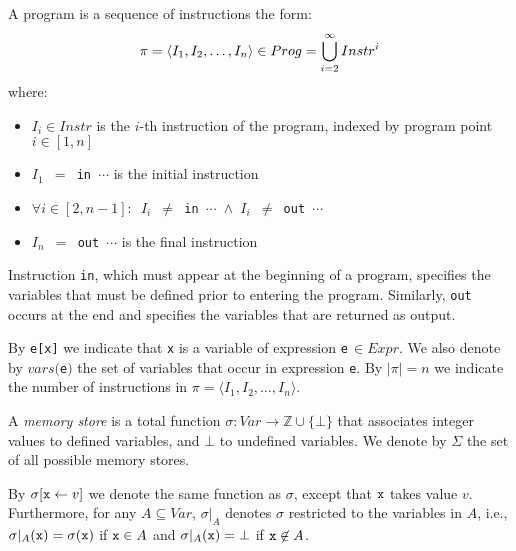 \begin{definition}[Program]
\label{de:program}
A program is a sequence of instructions the form:
\vspace{-3mm}
\begin{equation*}
\pi=\langle I_1, I_2, \ldots, I_n \rangle\in Prog = \bigcup_{i=2}^{\infty} Instr^{i}
\vspace{-4mm}
\end{equation*}
where: 

\begin{itemize}[itemsep=3pt,parsep=0pt,topsep=3pt]
\item \texttt{$I_i\in Instr$} is the $i$-th instruction of the program, indexed by program point \texttt{$i\in[1,n]$}
\item \texttt{$I_1$ $=$ in $\cdots$} is the initial instruction
\item \texttt{$\forall i\in[2,n-1]:$ $I_i$ $\neq$ in $\cdots$ $\wedge$ $I_i$ $\neq$ out $\cdots$}
\item \texttt{$I_n$ $=$ out $\cdots$} is the final instruction
\end{itemize}
\end{definition}

\noindent Instruction \texttt{in}, which must appear at the beginning of a program, specifies the variables that must be defined prior to entering the program. Similarly, \texttt{out} occurs at the end and specifies the variables that are returned as output. 

By \texttt{e[x]} we indicate that \texttt{x} is a variable of expression \texttt{e}\,$\in Expr$. We also denote by $vars($\texttt{e}$)$ the set of variables that occur in expression \texttt{e}. By $|\pi|=n$ we indicate the number of instructions in $\pi=\langle I_1, I_2, \ldots, I_n \rangle$.

\begin{definition}
A {\em memory store} is a total function $\sigma:Var\rightarrow \mathbb{Z}\cup\{\bot\}$ that associates integer values to defined variables, and $\bot$ to undefined variables. We denote by $\Sigma$ the set of all possible memory stores. 
\end{definition}

\noindent By $\sigma[\text{${\tt x}$}\gets v]$ we denote the same function as $\sigma$, except that $\text{${\tt x}$}$ takes value $v$. Furthermore, for any $A\subseteq Var$, $\sigma\vert_{A}$ denotes $\sigma$ restricted to the variables in $A$, i.e., $\sigma\vert_{A}(\text{${\tt x}$})=\sigma(\texttt{x})$ if $\text{${\tt x}$}\in A$ and $\sigma\vert_{A}(\text{${\tt x}$})=\bot$ if $\text{${\tt x}$}\not\in A$. 

